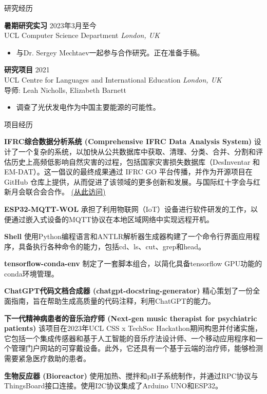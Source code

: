 \documentclass{resume_cn} %
\begin{document}
\begin{rSection}{研究经历}

\textbf{暑期研究实习} \hfill 2023年3月至今\\
UCL Computer Science Department \hfill \textit{London, UK}
\begin{itemize}
    \itemsep -3pt {} 
    \item 与Dr. Sergey Mechtaev一起参与合作研究。正在准备手稿。
\end{itemize}

\textbf{研究项目} \hfill 2021\\
UCL Centre for Languages and International Education \hfill \textit{London, UK}\\
导师: Leah Nicholls, Elizabeth Barnett
\begin{itemize}
    \itemsep -3pt {} 
    \item 调查了光伏发电作为中国主要能源的可能性。
\end{itemize}

\end{rSection}
\begin{rSection}{项目经历}
    \vspace{-1.25em}
    \item \textbf{IFRC综合数据分析系统 (Comprehensive IFRC Data Analysis System)} {设计了一个复杂的系统，以加快从公共数据库中获取、清理、分类、合并、分割和评估历史上高频低影响自然灾害的过程，包括国家灾害损失数据库（DesInventar 和 EM-DAT）。这一倡议的最终成果通过 IFRC GO 平台传播，并作为开源项目在 GitHub 仓库上提供，从而促进了该领域的更多创新和发展。与国际红十字会与红新月会联合会合作。
    \href{https://students.cs.ucl.ac.uk/2022/group5/index.html}{(从此访问)}}
    \item \textbf{ESP32-MQTT-WOL} {承担了利用物联网（IoT）设备进行软件研发的工作，以便通过嵌入式设备的MQTT协议在本地区域网络中实现远程开机。}
    \item \textbf{Shell} {使用Python编程语言和ANTLR解析器生成器构建了一个命令行界面应用程序，具备执行各种命令的能力，包括cd、ls、cut、grep和head。}
    \item \textbf{tensorflow-conda-env} {制定了一套脚本组合，以简化具备tensorflow GPU功能的conda环境管理。}
    \item \textbf{ChatGPT代码文档合成器 (chatgpt-docstring-generator)} {精心策划了一份全面指南，旨在帮助生成高质量的代码注释，利用ChatGPT的能力。}
    \item \textbf{下一代精神病患者的音乐治疗师 (Next-gen music therapist for psychiatric patients)} {该项目在2023年UCL CSS x TechSoc Hackathon期间构思并付诸实施，它包括一个集成传感器和基于人工智能的音乐疗法设计师、一个移动应用程序和一个管理门户网站的可穿戴设备。此外，它还具有一个基于云端的治疗师，能够检测需要紧急医疗救助的患者。}
    \item \textbf{生物反应器 (Bioreactor)} {使用加热、搅拌和pH子系统制作，并通过RPC协议与ThingsBoard接口连接。使用I2C协议集成了Arduino UNO和ESP32。}
\end{rSection} 
\end{document}
